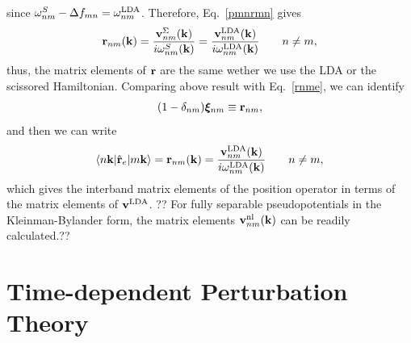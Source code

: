 \documentclass[floatfix,prb,aps,superscriptaddress,11pt,preprint]{revtex4}
\begin{document}
since
$\omega^S_{nm}-\Delta f_{mn}=\omega^{\mathrm{LDA}}_{nm}$. Therefore, 
Eq.~\eqref{pmnrmn} gives
\begin{eqnarray}\label{chon.10}
\mathbf{r}_{nm}(\mathbf{k})
=
\frac{\mathbf{v}^\Sigma_{nm}(\mathbf{k})}{i\omega^S_{nm}(\mathbf{k})}
=
\frac{\mathbf{v}^{\mathrm{LDA}}_{nm}(\mathbf{k})}{i\omega^{\mathrm{LDA}}_{nm}(\mathbf{k})}
\quad\quad n\ne m
,
\end{eqnarray}
thus,
the matrix elements
of $\mathbf{r}$ are the same wether we use the LDA or the scissored Hamiltonian.
Comparing above result with Eq.~\eqref{rnme}, 
we can identify 
\begin{equation}\label{xir}
(1-\delta_{nm})\boldsymbol{\xi}_{nm}\equiv \mathbf{r}_{nm}
,
\end{equation}
and then we can write
\begin{equation}\label{chon.98}
\langle n\mathbf{k} |\hat{\mathbf{r}}_e| m\mathbf{k} \rangle =
\mathbf{r}_{nm}(\mathbf{k})=\frac{\mathbf{v}^{\mathrm{LDA}}_{nm}(\mathbf{k})}{i\omega^{\mathrm{LDA}}_{nm}(\mathbf{k})}
\quad\quad n\ne m
,
\end{equation}  
which gives the interband matrix elements of the position operator
in terms of the matrix elements of $\mathbf{v}^{\mathrm{LDA}}$. 
??
For fully  separable pseudopotentials in the 
Kleinman-Bylander form,
\cite{motta_implementation_2010,kleinman_efficacious_1982,adolph_nonlocality_1996}
the matrix elements $\mathbf{v}^{\mathrm{nl}}_{nm}(\mathbf{k})$ can be readily calculated.\cite{francesco}??


\section{Time-dependent Perturbation Theory}\label{tdpt}
\end{document}
